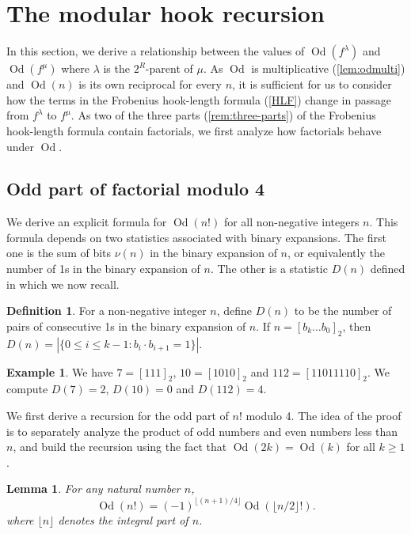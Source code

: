 \documentclass[12pt]{amsart}
\newtheorem{lemma}[theorem]{Lemma}
\theoremstyle{definition}
\newtheorem{definition}[theorem]{Definition}
\newtheorem{example}[theorem]{Example}
\numberwithin{equation}{section}
\newcommand{\la}{\lambda}
\newcommand{\workhorse}{modular hook recursion}
\DeclareMathOperator{\Od}{Od}
\begin{document}
\section{The \workhorse}\label{sec:workhorse}
In this section, we derive a relationship between the values of $\Od(f^\la)$ and $\Od(f^\mu)$ where $\la$ is the $2^R$-parent of $\mu$. As $\Od$ is multiplicative (\cref{lem:odmulti}) and $\Od(n)$ is its own reciprocal for every $n$, it is sufficient for us to consider how the terms in the Frobenius hook-length formula (\cref{HLF}) change in passage from $f^\la$ to $f^\mu$. As two of the three parts (\cref{rem:three-parts}) of the Frobenius hook-length formula contain factorials, we first analyze how factorials behave under $\Od$.


\subsection{Odd part of factorial modulo 4} We derive an explicit formula for $\Od(n!)$ for all non-negative integers $n$. This formula depends on two statistics associated with binary expansions. The first one is the sum of bits $\nu(n)$ in the binary expansion of $n$, or equivalently the number of 1s in the binary expansion of $n$. The other is a statistic $D(n)$ defined in \cite{Bin4} which we now recall.
\begin{definition}
For a non-negative integer $n$, define $D(n)$ to be the number of pairs of consecutive 1s in the binary expansion of $n$. If $n=[b_k\ldots b_0]_2$, then $D(n) = |\{0\leq i \leq k-1: b_i\cdot b_{i+1} =1\}|$.
\end{definition}
\begin{example}
We have $7 = [111]_2$, $10 = [1010]_2$ and $112 = [11011110]_2$.
We compute $D(7) = 2$, $D(10) =0$ and $D(112) =  4$.
\end{example}
We first derive a recursion for the odd part of $n!$ modulo 4. The idea of the proof is to separately analyze the product of odd numbers and even numbers less than $n$, and build the recursion using the fact that $\Od(2k) = \Od(k)$ for all $k\geq 1$.
\begin{lemma}\label{lem:odnfac-rec}
    For any natural number $n$, \[
\Od(n!) = (-1)^{\lfloor (n+1)/4\rfloor}\Od(\lfloor n/2 \rfloor!).
\]
where $\lfloor n \rfloor$ denotes the integral part of $n$.
\end{lemma}
\end{document}
